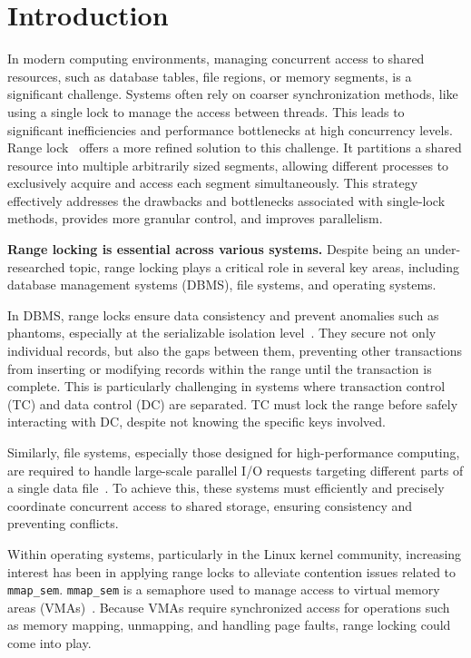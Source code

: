 \chapter{Introduction}\label{chapter:introduction}

In modern computing environments, managing concurrent access to shared resources, such as database tables, file regions, or memory segments, is a significant challenge.
Systems often rely on coarser synchronization methods, like using a single lock to manage the access between threads. 
This leads to significant inefficiencies and performance bottlenecks at high concurrency levels. 
Range lock~\parencite{gao2023citron, kogan2020scalable, song2013parallelizing} offers a more refined solution to this challenge. 
It partitions a shared resource into multiple arbitrarily sized segments, allowing different processes to exclusively acquire and access each segment simultaneously.
This strategy effectively addresses the drawbacks and bottlenecks associated with single-lock methods, provides more granular control, and improves parallelism.

\textbf{Range locking is essential across various systems.}  
Despite being an under-researched topic, range locking plays a critical role in several key areas, including database management systems (DBMS), file systems, and operating systems.

In DBMS, range locks ensure data consistency and prevent anomalies such as phantoms, especially at the serializable isolation level~\parencite{lomet2009locking}. 
They secure not only individual records, but also the gaps between them, preventing other transactions from inserting or modifying records within the range until the transaction is complete. 
This is particularly challenging in systems where transaction control (TC) and data control (DC) are separated. 
TC must lock the range before safely interacting with DC, despite not knowing the specific keys involved.

Similarly, file systems, especially those designed for high-performance computing, are required to handle large-scale parallel I/O requests targeting different parts of a single data file~\parencite{congiu2016improving, kang2021optimizing}. 
To achieve this, these systems must efficiently and precisely coordinate concurrent access to shared storage, ensuring consistency and preventing conflicts.

Within operating systems, particularly in the Linux kernel community, increasing interest has been in applying range locks to alleviate contention issues related to \texttt{mmap\_sem}. 
\texttt{mmap\_sem} is a semaphore used to manage access to virtual memory areas (VMAs)~\parencite{readerWriterLocks2017, mapleTree2021, mmapLock2022}. 
Because VMAs require synchronized access for operations such as memory mapping, unmapping, and handling page faults, range locking could come into play.

